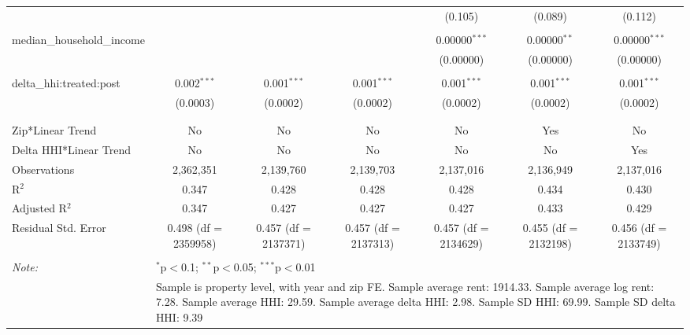 \begin{table}[H]
{\begin{tabular}{@{\extracolsep{5pt}}lcccccc}
   &  &  &  & (0.105) & (0.089) & (0.112) \\  

   & & & & & & \\  

  median\_household\_income &  &  &  & 0.00000$^{***}$ & 0.00000$^{**}$ & 0.00000$^{***}$ \\  

   &  &  &  & (0.00000) & (0.00000) & (0.00000) \\  

   & & & & & & \\  

  delta\_hhi:treated:post & 0.002$^{***}$ & 0.001$^{***}$ & 0.001$^{***}$ & 0.001$^{***}$ & 0.001$^{***}$ & 0.001$^{***}$ \\  

   & (0.0003) & (0.0002) & (0.0002) & (0.0002) & (0.0002) & (0.0002) \\  

   & & & & & & \\  

 \hline \\[-1.8ex]  

 Zip*Linear Trend & No & No & No & No & Yes & No \\  

 Delta HHI*Linear Trend & No & No & No & No & No & Yes \\  

 Observations & 2,362,351 & 2,139,760 & 2,139,703 & 2,137,016 & 2,136,949 & 2,137,016 \\  

 R$^{2}$ & 0.347 & 0.428 & 0.428 & 0.428 & 0.434 & 0.430 \\  

 Adjusted R$^{2}$ & 0.347 & 0.427 & 0.427 & 0.427 & 0.433 & 0.429 \\  

 Residual Std. Error & 0.498 (df = 2359958) & 0.457 (df = 2137371) & 0.457 (df = 2137313) & 0.457 (df = 2134629) & 0.455 (df = 2132198) & 0.456 (df = 2133749) \\  

 \hline  

 \hline \\[-1.8ex]  

 \textit{Note:}  & \multicolumn{6}{l}{$^{*}$p$<$0.1; $^{**}$p$<$0.05; $^{***}$p$<$0.01} \\  

  & \multicolumn{6}{l}{Sample is property level, with year and zip FE. Sample average rent: 1914.33. Sample average log rent: 7.28. Sample average HHI: 29.59. Sample average delta HHI: 2.98. Sample SD HHI: 69.99. Sample SD delta HHI: 9.39} \\  

 \end{tabular}}  

 \end{table}  


